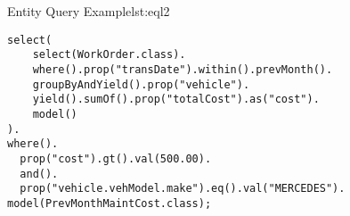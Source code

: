   \begin{code}{Entity Query Example}{lst:eql2}
    \begin{lstlisting}
select(
    select(WorkOrder.class).
    where().prop("transDate").within().prevMonth().
    groupByAndYield().prop("vehicle").
    yield().sumOf().prop("totalCost").as("cost").
    model()  
).
where().
  prop("cost").gt().val(500.00).
  and().
  prop("vehicle.vehModel.make").eq().val("MERCEDES").
model(PrevMonthMaintCost.class);
    \end{lstlisting}
   \end{code}  
  
  
% 
%   
  
